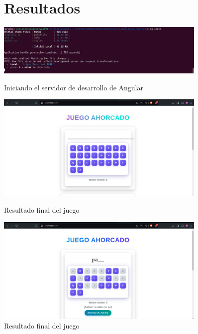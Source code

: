 \documentclass{article}
\begin{document}
\begin{figure}[htbp]
\section{Resultados}
    \centering
    \begin{minipage}{1\textwidth}
        \centering
        \includegraphics[width=0.9\textwidth]{img/resul1.png}
        \caption{Iniciando el servidor de desarrollo de Angular}
        \label{fig:resul1}
    \end{minipage}
    \vspace{1cm}
    \begin{minipage}{1\textwidth}
        \centering
        \includegraphics[width=0.9\textwidth]{img/reult2.png}
        \caption{Resultado final del juego}
        \label{fig:enter-label2}
    \end{minipage}
    \vspace{1cm}
    \begin{minipage}{1\textwidth}
        \centering
        \includegraphics[width=0.9\textwidth]{img/result2.png}
        \caption{Resultado final del juego}
        \label{fig:result2}
    \end{minipage}
    \vspace{1.5cm}

\end{figure}
\end{document}
